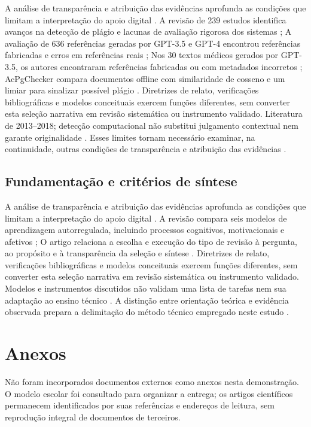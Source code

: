 A análise de transparência e atribuição das evidências aprofunda as condições que limitam a interpretação do apoio digital \citep{SU05} \citep{SU06} \citep{SU07} \citep{SU08}. A revisão de 239 estudos identifica avanços na detecção de plágio e lacunas de avaliação rigorosa dos sistemas \citep{SU05}; A avaliação de 636 referências geradas por GPT-3.5 e GPT-4 encontrou referências fabricadas e erros em referências reais \citep{SU06}; Nos 30 textos médicos gerados por GPT-3.5, os autores encontraram referências fabricadas ou com metadados incorretos \citep{SU07}; AcPgChecker compara documentos offline com similaridade de cosseno e um limiar para sinalizar possível plágio \citep{SU08}. Diretrizes de relato, verificações bibliográficas e modelos conceituais exercem funções diferentes, sem converter esta seleção narrativa em revisão sistemática ou instrumento validado. Literatura de 2013–2018; detecção computacional não substitui julgamento contextual nem garante originalidade \citep{SU05} \citep{SU06} \citep{SU07} \citep{SU08}. Esses limites tornam necessário examinar, na continuidade, outras condições de transparência e atribuição das evidências \citep{SU05} \citep{SU06} \citep{SU07} \citep{SU08}.

\clearpage\subsection*{Fundamentação e critérios de síntese}

A análise de transparência e atribuição das evidências aprofunda as condições que limitam a interpretação do apoio digital \citep[p. 1, 3]{SU10} \citep[p. 336–337]{SU11}. A revisão compara seis modelos de aprendizagem autorregulada, incluindo processos cognitivos, motivacionais e afetivos \citep[p. 1, 3]{SU10}; O artigo relaciona a escolha e execução do tipo de revisão à pergunta, ao propósito e à transparência da seleção e síntese \citep[p. 336–337]{SU11}. Diretrizes de relato, verificações bibliográficas e modelos conceituais exercem funções diferentes, sem converter esta seleção narrativa em revisão sistemática ou instrumento validado. Modelos e instrumentos discutidos não validam uma lista de tarefas nem sua adaptação ao ensino técnico \citep[p. 1, 3]{SU10} \citep[p. 336–337]{SU11}. A distinção entre orientação teórica e evidência observada prepara a delimitação do método técnico empregado neste estudo \citep[p. 1, 3]{SU10} \citep[p. 336–337]{SU11}.

\clearpage\section*{Anexos}

Não foram incorporados documentos externos como anexos nesta demonstração. O modelo escolar foi consultado para organizar a entrega; os artigos científicos permanecem identificados por suas referências e endereços de leitura, sem reprodução integral de documentos de terceiros.
